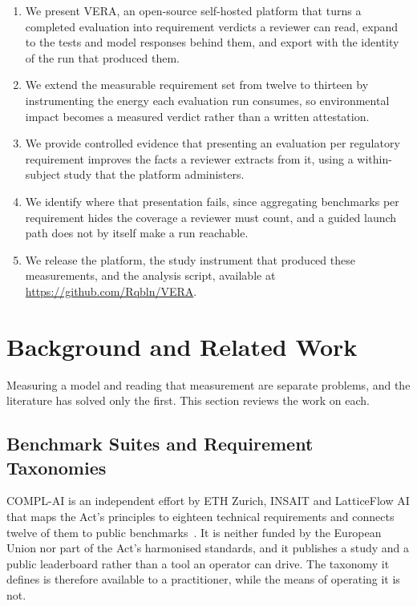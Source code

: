 \documentclass[10pt,conference]{IEEEtran}
\providecommand{\repourl}{https://github.com/Rqbln/VERA}
\begin{document}
\begin{enumerate}
   \item We present VERA, an open-source self-hosted platform that turns a completed evaluation into requirement verdicts a reviewer can read, expand to the tests and model responses behind them, and export with the identity of the run that produced them.
  \item We extend the measurable requirement set from twelve to thirteen by instrumenting the energy each evaluation run consumes, so environmental impact becomes a measured verdict rather than a written attestation.
  \item We provide controlled evidence that presenting an evaluation per regulatory requirement improves the facts a reviewer extracts from it, using a within-subject study that the platform administers.
  \item We identify where that presentation fails, since aggregating benchmarks per requirement hides the coverage a reviewer must count, and a guided launch path does not by itself make a run reachable.
  \item We release the platform, the study instrument that produced these measurements, and the analysis script, available at \url{\repourl}.
\end{enumerate}



\section{Background and Related Work}
\label{sec:background}

Measuring a model and reading that measurement are separate problems, and the literature has solved only the first.
This section reviews the work on each.

\subsection{Benchmark Suites and Requirement Taxonomies}
COMPL-AI is an independent effort by ETH Zurich, INSAIT and LatticeFlow AI that maps the Act's principles to eighteen technical requirements and connects twelve of them to public benchmarks~\cite{guldimann2024complai}.
It is neither funded by the European Union nor part of the Act's harmonised standards, and it publishes a study and a public leaderboard rather than a tool an operator can drive.
The taxonomy it defines is therefore available to a practitioner, while the means of operating it is not.
\end{document}

